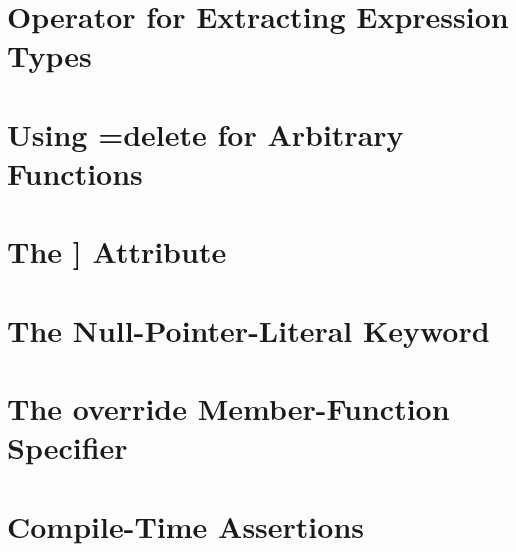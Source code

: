 \newpage
\section[{\tt decltype}]{Operator for Extracting Expression Types}\label{decltype}
\setcounter{table}{0}
\setcounter{footnote}{0}
\setcounter{lstlisting}{0}


\newpage
\section[Deleted Functions]{Using {\SecCode =delete} for Arbitrary Functions}\label{deleted-functions}
\setcounter{table}{0}
\setcounter{footnote}{0}
\setcounter{lstlisting}{0}


\newpage
\section[{\tt noreturn}]{The {\SecCode [[noreturn]]} Attribute}\label{the-noreturn-attribute}
\setcounter{table}{0}
\setcounter{footnote}{0}
\setcounter{lstlisting}{0}


\newpage
\section[{\tt nullptr}]{The Null-Pointer-Literal Keyword}\label{null-pointer-literal-(nullptr)}
\setcounter{table}{0}
\setcounter{footnote}{0}
\setcounter{lstlisting}{0}



\newpage
\section[{\tt override}]{The {\SecCode override} Member-Function Specifier}\label{override}
\setcounter{table}{0}
\setcounter{footnote}{0}
\setcounter{lstlisting}{0}


\newpage
\section[{\tt static\_assert}]{Compile-Time Assertions}\label{compile-time-assertions-(static_assert)}
\setcounter{table}{0}
\setcounter{footnote}{0}
\setcounter{lstlisting}{0}


